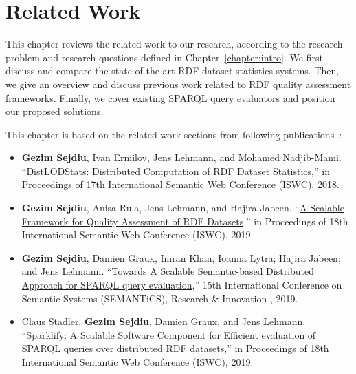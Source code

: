 \chapter{Related Work}
\label{chapter:related}

This chapter reviews the related work to our research, according to the research problem and research questions defined in Chapter~\ref{chapter:intro}.
We first discuss and compare the state-of-the-art RDF dataset statistics systems.
Then, we give an overview and discuss previous work related to RDF quality assessment frameworks. 
Finally, we cover existing SPARQL query evaluators and position our proposed solutions. 

This chapter is based on the related work sections from following publications~\cite{sejdiu-2018-dist-lod-stats-iswc,sejdiu-2019-sansa-dist-quality-assessment-iswc,sejdiu-2019-sansa-semantic-based-semantics, 2019-sansa-sparklify-iswc}:

\begin{itemize}
    \item \textbf{Gezim Sejdiu}, Ivan Ermilov, Jens Lehmann, and Mohamed Nadjib-Mami. “\href{http://jens-lehmann.org/files/2018/iswc_distlodstats.pdf}{DistLODStats: Distributed Computation of RDF Dataset Statistics},” in Proceedings of 17th International Semantic Web Conference (ISWC), 2018.
    
    \item \textbf{Gezim Sejdiu}, Anisa Rula, Jens Lehmann, and Hajira Jabeen. “\href{http://jens-lehmann.org/files/2019/iswc_dist_quality_assessment.pdf}{A Scalable Framework for Quality Assessment of RDF Datasets},” in Proceedings of 18th International Semantic Web Conference (ISWC), 2019.
    
    \item \textbf{Gezim Sejdiu}, Damien Graux, Imran Khan, Ioanna Lytra; Hajira Jabeen; and Jens Lehmann. “\href{https://gezimsejdiu.github.io/publications/semantic_based_query_paper_SEMANTICS2019.pdf}{Towards A Scalable Semantic-based Distributed Approach for SPARQL query evaluation},” 15th International Conference on Semantic Systems (SEMANTiCS), Research \& Innovation , 2019.
     
    \item Claus Stadler, \textbf{Gezim Sejdiu}, Damien Graux, and Jens Lehmann. “\href{http://jens-lehmann.org/files/2019/iswc_sparklify.pdf}{Sparklify: A Scalable Software Component for Efficient evaluation of SPARQL queries over distributed RDF datasets},” in Proceedings of 18th International Semantic Web Conference (ISWC), 2019. 
    
\end{itemize}

